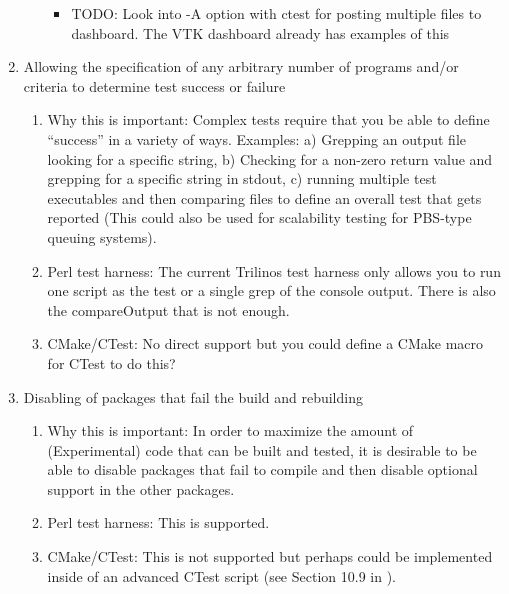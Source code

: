 \documentclass[pdf,ps2pdf,11pt]{SANDreport}
\begin{document}
\begin{enumerate}
\begin{enumerate}
    \begin{itemize}

    {}\item TODO: Look into -A option with ctest for posting multiple
    files to dashboard.  The VTK dashboard already has examples of
    this

    \end{itemize}

  \end{enumerate}

{}\item Allowing the specification of any arbitrary number of
programs and/or criteria to determine test success or failure

  \begin{enumerate}

  {}\item Why this is important: Complex tests require that you be
  able to define ``success'' in a variety of ways.  Examples: a)
  Grepping an output file looking for a specific string, b) Checking
  for a non-zero return value and grepping for a specific string in
  stdout, c) running multiple test executables and then comparing
  files to define an overall test that gets reported (This could also
  be used for scalability testing for PBS-type queuing systems).

  {}\item Perl test harness: The current Trilinos test harness only
  allows you to run one script as the test or a single grep of the
  console output.  There is also the compareOutput that is not
  enough.

  {}\item CMake/CTest: No direct support but you could define a
  CMake macro for CTest to do this?

  \end{enumerate}

{}\item Disabling of packages that fail the build and rebuilding

  \begin{enumerate}

  {}\item Why this is important: In order to maximize the amount of
  (Experimental) code that can be built and tested, it is desirable
  to be able to disable packages that fail to compile and then
  disable optional support in the other packages.

  {}\item Perl test harness: This is supported.

  {}\item CMake/CTest: This is not supported but perhaps could be
  implemented inside of an advanced CTest script (see Section 10.9
  in {}\cite{MasteringCMake_fourth}).

  \end{enumerate}

\end{enumerate}
\end{document}
